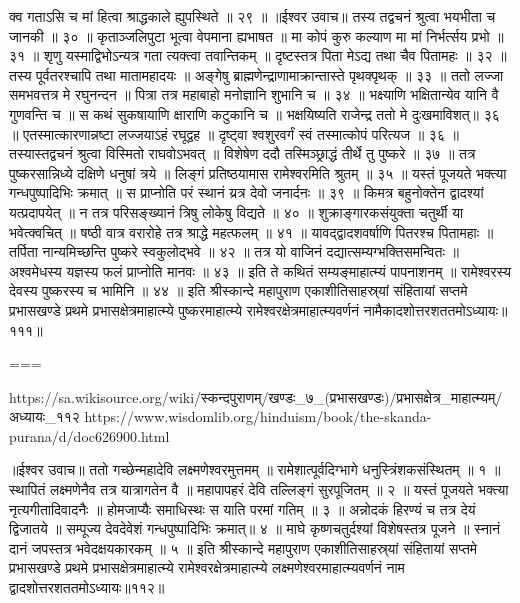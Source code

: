 क्व गताऽसि च मां हित्वा श्राद्धकाले ह्युपस्थिते ॥ २९ ॥
॥ईश्वर उवाच॥
तस्य तद्वचनं श्रुत्वा भयभीता च जानकी ॥ ३० ॥
कृताञ्जलिपुटा भूत्वा वेपमाना ह्यभाषत ॥
मा कोपं कुरु कल्याण मा मां निर्भर्त्सय प्रभो ॥ ३१ ॥
शृणु यस्माद्विभोऽन्यत्र गता त्यक्त्वा तवान्तिकम् ॥
दृष्टस्तत्र पिता मेऽद्य तथा चैव पितामहः ॥ ३२ ॥
तस्य पूर्वतरश्चापि तथा मातामहादयः ॥
अङ्गेषु ब्राह्मणेन्द्राणामाक्रान्तास्ते पृथक्पृथक् ॥ ३३ ॥
ततो लज्जा समभवत्तत्र मे रघुनन्दन ॥
पित्रा तत्र महाबाहो मनोज्ञानि शुभानि च ॥ ३४ ॥
भक्ष्याणि भक्षितान्येव यानि वै गुणवन्ति च ॥
स कथं सुकषायाणि क्षाराणि कटुकानि च ॥
भक्षयिष्यति राजेन्द्र ततो मे दुःखमाविशत्॥ ३६ ॥
एतस्मात्कारणान्नष्टा लज्जयाऽहं रघूद्वह ॥
दृष्ट्वा श्वशुरवर्गं स्वं तस्मात्कोपं परित्यज ॥ ३६ ॥
तस्यास्तद्वचनं श्रुत्वा विस्मितो राघवोऽभवत् ॥
विशेषेण ददौ तस्मिञ्छ्राद्धं तीर्थे तु पुष्करे ॥ ३७ ॥
तत्र पुष्करसान्निध्ये दक्षिणे धनुषां त्रये ॥
लिङ्गं प्रतिष्ठयामास रामेश्वरमिति श्रुतम् ॥ ३५ ॥
यस्तं पूजयते भक्त्या गन्धपुष्पादिभिः क्रमात् ॥
स प्राप्नोति परं स्थानं य्रत्र देवो जनार्दनः ॥ ३९ ॥
किमत्र बहुनोक्तेन द्वादश्यां यत्प्रदापयेत् ॥
न तत्र परिसङ्ख्यानं त्रिषु लोकेषु विद्यते ॥ ४० ॥
शुक्राङ्गारकसंयुक्ता चतुर्थी या भवेत्क्वचित् ॥
षष्ठी वात्र वरारोहे तत्र श्राद्धे महत्फलम् ॥ ४१ ॥
यावद्द्वादशवर्षाणि पितरश्च पितामहाः ॥
तर्पिता नान्यमिच्छन्ति पुष्करे स्वकुलोद्भवे ॥ ४२ ॥
तत्र यो वाजिनं दद्यात्सम्यग्भक्तिसमन्वितः ॥
अश्वमेधस्य यज्ञस्य फलं प्राप्नोति मानवः ॥ ४३ ॥
इति ते कथितं सम्यङ्माहात्म्यं पापनाशनम् ॥
रामेश्वरस्य देवस्य पुष्करस्य च भामिनि ॥ ४४ ॥
इति श्रीस्कान्दे महापुराण एकाशीतिसाहस्र्यां संहितायां सप्तमे प्रभासखण्डे प्रथमे प्रभासक्षेत्रमाहात्म्ये पुष्करमाहात्म्ये रामेश्वरक्षेत्रमाहात्म्यवर्णनं नामैकादशोत्तरशततमोऽध्यायः॥१११॥

===

https://sa.wikisource.org/wiki/स्कन्दपुराणम्/खण्डः_७_(प्रभासखण्डः)/प्रभासक्षेत्र_माहात्म्यम्/अध्यायः_११२
https://www.wisdomlib.org/hinduism/book/the-skanda-purana/d/doc626900.html


॥ईश्वर उवाच॥
ततो गच्छेन्महादेवि लक्ष्मणेश्वरमुत्तमम् ॥
रामेशात्पूर्वदिग्भागे धनुस्त्रिंशकसंस्थितम् ॥ १ ॥
स्थापितं लक्ष्मणेनैव तत्र यात्रागतेन वै ॥
महापापहरं देवि तल्लिङ्गं सुरपूजितम् ॥ २ ॥
यस्तं पूजयते भक्त्या नृत्यगीतादिवादनैः ॥
होमजाप्यैः समाधिस्थः स याति परमां गतिम् ॥ ३ ॥
अन्नोदकं हिरण्यं च तत्र देयं द्विजातये ॥
सम्पूज्य देवदेवेशं गन्धपुष्पादिभिः क्रमात्॥ ४ ॥
माघे कृष्णचतुर्दश्यां विशेषस्तत्र पूजने ॥
स्नानं दानं जपस्तत्र भवेदक्षयकारकम् ॥ ५ ॥
इति श्रीस्कान्दे महापुराण एकाशीतिसाहस्र्यां संहितायां सप्तमे प्रभासखण्डे प्रथमे प्रभासक्षेत्रमाहात्म्ये रामेश्वरक्षेत्रमाहात्म्ये लक्ष्मणेश्वरमाहात्म्यवर्णनं नाम द्वादशोत्तरशततमोऽध्यायः॥११२॥


